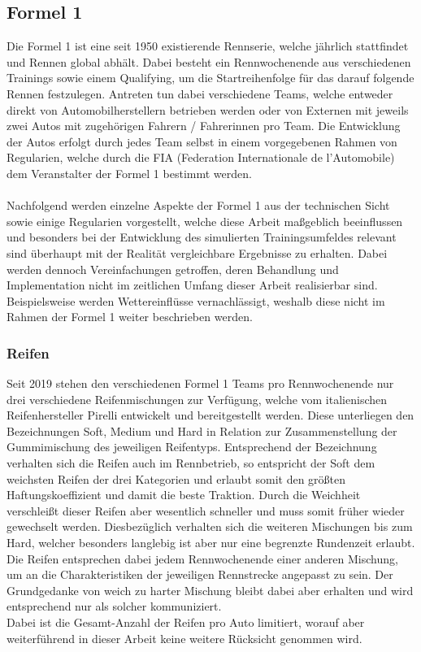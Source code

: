 \subsection{Formel 1} %
Die Formel 1 ist eine seit 1950 existierende Rennserie, welche jährlich stattfindet und Rennen global abhält. Dabei besteht ein Rennwochenende aus verschiedenen Trainings sowie einem Qualifying, um die Startreihenfolge für das darauf folgende Rennen festzulegen. Antreten tun dabei verschiedene Teams, welche entweder direkt von Automobilherstellern betrieben werden oder von Externen mit jeweils zwei Autos mit zugehörigen Fahrern / Fahrerinnen pro Team. Die Entwicklung der Autos erfolgt durch jedes Team selbst in einem vorgegebenen Rahmen von Regularien, welche durch die FIA (Federation Internationale de l’Automobile) dem Veranstalter der Formel 1 bestimmt werden. 
\\\\
Nachfolgend werden einzelne Aspekte der Formel 1 aus der technischen Sicht sowie einige Regularien vorgestellt, welche diese Arbeit maßgeblich beeinflussen und besonders bei der Entwicklung des simulierten Trainingsumfeldes relevant sind überhaupt mit der Realität vergleichbare Ergebnisse zu erhalten. Dabei werden dennoch Vereinfachungen getroffen, deren Behandlung und Implementation nicht im zeitlichen Umfang dieser Arbeit realisierbar sind. Beispielsweise werden Wettereinflüsse vernachlässigt, weshalb diese nicht im Rahmen der Formel 1 weiter beschrieben werden.

\subsubsection{Reifen} %

Seit 2019 stehen den verschiedenen Formel 1 Teams pro Rennwochenende nur drei verschiedene Reifenmischungen zur Verfügung, welche vom italienischen Reifenhersteller Pirelli entwickelt und bereitgestellt werden. Diese unterliegen den Bezeichnungen \glqq Soft\grqq{}, \glqq Medium\grqq{} und \glqq Hard\grqq{} in Relation zur Zusammenstellung der Gummimischung des jeweiligen Reifentyps. Entsprechend der Bezeichnung verhalten sich die Reifen auch im Rennbetrieb, so entspricht der \glqq Soft\grqq{} dem weichsten Reifen der drei Kategorien und erlaubt somit den größten Haftungskoeffizient und damit die beste Traktion. Durch die Weichheit verschleißt dieser Reifen aber wesentlich schneller und muss somit früher wieder gewechselt werden. Diesbezüglich verhalten sich die weiteren Mischungen bis zum \glqq Hard\grqq, welcher besonders langlebig ist aber nur eine begrenzte Rundenzeit erlaubt. Die Reifen entsprechen dabei jedem Rennwochenende einer anderen Mischung, um an die Charakteristiken der jeweiligen Rennstrecke angepasst zu sein. Der Grundgedanke von weich zu harter Mischung bleibt dabei aber erhalten und wird entsprechend nur als solcher kommuniziert.\\
Dabei ist die Gesamt-Anzahl der Reifen pro Auto limitiert, worauf aber weiterführend in dieser Arbeit keine weitere Rücksicht genommen wird.

